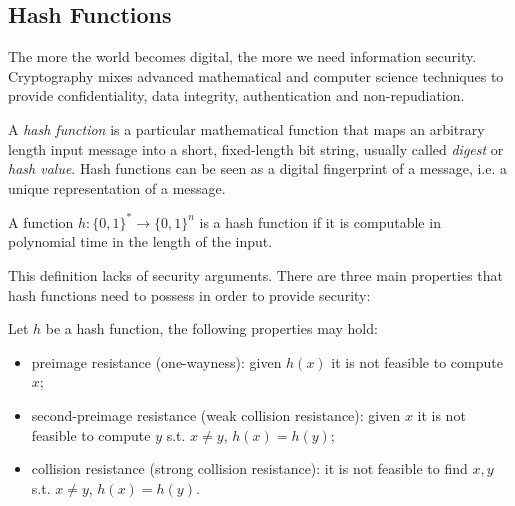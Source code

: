 \subsection{Hash Functions}
\label{sub:hash}
The more the world becomes digital, the more we need information security. Cryptography mixes advanced mathematical and computer science techniques to provide confidentiality, data integrity, authentication and non-repudiation.

\bigskip
\noindent
A \textit{hash function} is a particular mathematical function that maps an arbitrary length input message into a short, fixed-length bit string, usually called \textit{digest} or \textit{hash value}. Hash functions can be seen as a digital fingerprint of a message, i.e. a unique representation of a message.

\begin{mydef}
    \label{def:hash}
	A function $h : \{ 0, 1 \} ^* \rightarrow \{ 0, 1 \} ^n $ is a hash function if it is computable in polynomial time in the length of the input.
\end{mydef}

\bigskip
\noindent
This definition lacks of security arguments. There are three main properties that hash functions need to possess in order to provide security:
\begin{mydef}
	\label{def:hash-prop}
	Let $h$ be a hash function, the following properties may hold:
	\begin{itemize}
		\item preimage resistance (one-wayness): given $h(x)$ it is not feasible to compute $x$;
		\item second-preimage resistance (weak collision resistance): given $x$ it is not feasible to compute $y$ s.t. $x \neq y$, $h(x)=h(y)$;
		\item collision resistance (strong collision resistance): it is not feasible to find $x, y$ s.t. $x \neq y$, $h(x)=h(y)$.
	\end{itemize}
\end{mydef}

